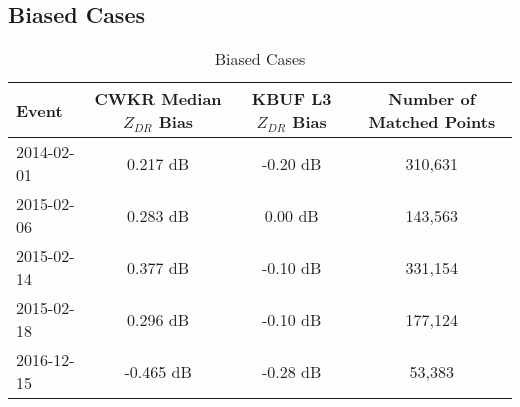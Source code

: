\subsection{Biased Cases}
\begin{table}[h]
    \caption{Biased Cases}\label{biasedcases}
    \begin{center}
    \begin{tabular}{|l|c|c|c|}
    \hline
     Event & CWKR Median $Z_{DR}$ Bias & KBUF L3 $Z_{DR}$ Bias & Number of Matched Points\\
    \hline\hline
    2014-02-01 & 0.217 dB & -0.20 dB & 310,631 \\
    \hline
    2015-02-06 & 0.283 dB & 0.00 dB & 143,563 \\
    \hline
    2015-02-14 & 0.377 dB & -0.10 dB & 331,154 \\
    \hline
    2015-02-18 & 0.296 dB & -0.10 dB & 177,124 \\
    \hline
    2016-12-15 & -0.465 dB & -0.28 dB & 53,383 \\
    \hline
    \end{tabular}
    \end{center}
\end{table}
